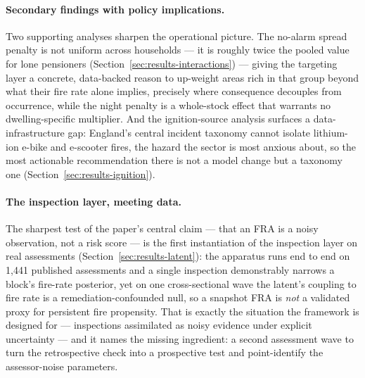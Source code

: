 \paragraph{Secondary findings with policy implications.} Two supporting analyses
sharpen the operational picture. The no-alarm spread penalty is not uniform across
households --- it is roughly twice the pooled value for lone pensioners
(Section~\ref{sec:results-interactions}) --- giving the targeting layer a concrete,
data-backed reason to up-weight areas rich in that group beyond what their fire rate
alone implies, precisely where consequence decouples from occurrence, while the night
penalty is a whole-stock effect that warrants no dwelling-specific multiplier. And the
ignition-source analysis surfaces a data-infrastructure gap: England's central
incident taxonomy cannot isolate lithium-ion e-bike and e-scooter fires, the hazard
the sector is most anxious about, so the most actionable recommendation there is not a
model change but a taxonomy one (Section~\ref{sec:results-ignition}).

\paragraph{The inspection layer, meeting data.} The sharpest test of the paper's
central claim --- that an FRA is a noisy observation, not a risk score --- is the first
instantiation of the inspection layer on real assessments
(Section~\ref{sec:results-latent}): the apparatus runs end to end on 1{,}441 published
assessments and a single inspection demonstrably narrows a block's fire-rate posterior,
yet on one cross-sectional wave the latent's coupling to fire rate is a
remediation-confounded null, so a snapshot FRA is \emph{not} a validated proxy for
persistent fire propensity. That is exactly the situation the framework is designed for
--- inspections assimilated as noisy evidence under explicit uncertainty --- and it
names the missing ingredient: a second assessment wave to turn the retrospective check
into a prospective test and point-identify the assessor-noise parameters.
